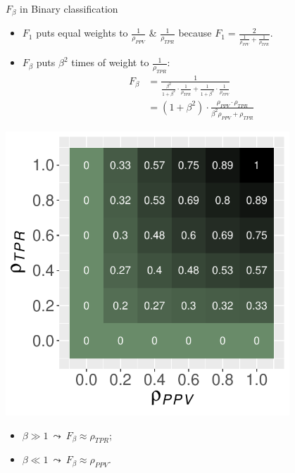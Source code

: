 \documentclass[11pt,compress,t,notes=noshow, xcolor=table]{beamer}
\begin{document}
\begin{frame}{$F_\beta$ in Binary classification}
    \footnotesize{
	
    	\begin{minipage}[c]{0.49\textwidth}
            \begin{itemize}
                \item $F_1$ puts equal weights to $\frac{1}{\rho_{PPV}}$ \& $\frac{1}{\rho_{TPR}}$ because $F_1 = \frac{2}{\frac{1}{\rho_{PPV}} + \frac{1}{\rho_{TPR}}}$.
                
                \item $F_\beta$ puts $\beta^2$ times of weight to $\frac{1}{\rho_{TPR}}$:
                    \begin{equation*}
                        \begin{aligned}
                            F_\beta &= \frac{1}{\frac{\beta^2}{1 + \beta^2} \cdot \frac{1}{\rho_{TPR}} + \frac{1}{1 + \beta^2} \cdot \frac{1}{\rho_{PPV}}} \\
                            &= (1 + \beta^2) \cdot \frac{\rho_{PPV} \cdot \rho_{TPR}}{\beta^2 \rho_{PPV} + \rho_{TPR}}
                        \end{aligned}
                    \end{equation*}
            \end{itemize}
    	\end{minipage}
    	\begin{minipage}[c]{0.49\textwidth}
    		\centering
    		\includegraphics[width=0.8\textwidth]{figure/f1_score_plot.pdf}
    	\end{minipage}
    	
    	\begin{itemize}
    		\item $\beta \gg 1 \ \leadsto \ F_\beta \approx \rho_{TPR}$;
            \item $\beta \ll 1 \ \leadsto \ F_\beta \approx \rho_{PPV}$.
      
    	\end{itemize}

    }
    
\end{frame}
\end{document}
